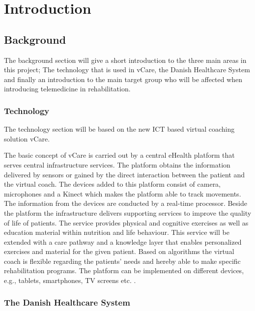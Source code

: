\chapter{Introduction}

\section{Background}
The background section will give a short introduction to the three main areas in this project; The technology that is used in vCare, the Danish Healthcare System and finally an introduction to the main target group who will be affected when introducing telemedicine in rehabilitation. 

\subsection{Technology}

The technology section will be based on the new ICT based virtual coaching solution vCare. 

The basic concept of vCare is carried out by a central eHealth platform that serves central infrastructure services. The platform obtains the information delivered by sensors or gained by the direct interaction between the patient and the virtual coach. The devices added to this platform consist of camera, microphones and a Kinect which makes the platform able to track movements. The information from the devices are conducted by a real-time processor. Beside the platform the infrastructure delivers supporting services to improve the quality of life of patients. The service provides physical and cognitive exercises as well as education material within nutrition and life behaviour. This service will be extended with a care pathway and a knowledge layer that enables personalized exercises and material for the given patient. Based on algorithms the virtual coach is flexible regarding the patients’ needs and hereby able to make specific rehabilitation programs. The platform can be implemented on different devices, e.g., tablets, smartphones, TV screens etc. \cite{Technical}. 


\subsection{The Danish Healthcare System}

